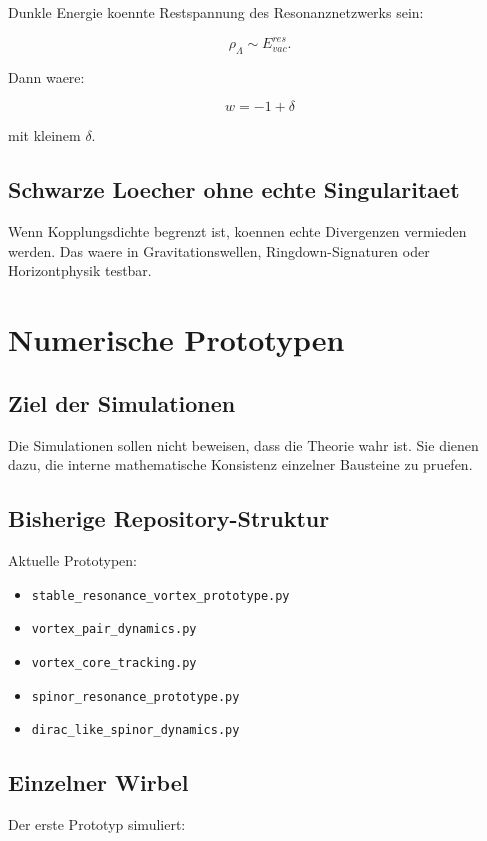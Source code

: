 \documentclass[11pt,a4paper]{article}
\begin{document}
Dunkle Energie koennte Restspannung des Resonanznetzwerks sein:

\[
\rho_\Lambda \sim E_{vac}^{res}.
\]

Dann waere:

\[
w=-1+\delta
\]

mit kleinem $\delta$.

\subsection{Schwarze Loecher ohne echte Singularitaet}

Wenn Kopplungsdichte begrenzt ist, koennen echte Divergenzen vermieden werden. Das waere in Gravitationswellen,
Ringdown-Signaturen oder Horizontphysik testbar.

\section{Numerische Prototypen}

\subsection{Ziel der Simulationen}

Die Simulationen sollen nicht beweisen, dass die Theorie wahr ist. Sie dienen dazu, die interne mathematische
Konsistenz einzelner Bausteine zu pruefen.

\subsection{Bisherige Repository-Struktur}

Aktuelle Prototypen:
\begin{itemize}
  \item \texttt{stable\_resonance\_vortex\_prototype.py}
  \item \texttt{vortex\_pair\_dynamics.py}
  \item \texttt{vortex\_core\_tracking.py}
  \item \texttt{spinor\_resonance\_prototype.py}
  \item \texttt{dirac\_like\_spinor\_dynamics.py}
\end{itemize}

\subsection{Einzelner Wirbel}

Der erste Prototyp simuliert:
\end{document}
